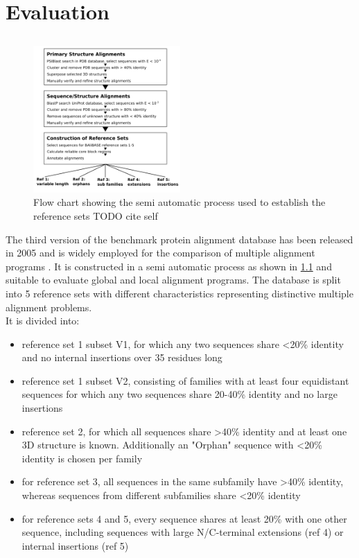 \chapter{Evaluation}

\section{}
\begin{figure}
	\centering
	\includegraphics[width=0.5\textwidth]{./images/balibase.png}
	\caption{Flow chart showing the semi automatic process used to establish the reference sets TODO cite self}
	\label{fig:balibase}
\end{figure}

The third version of the \bb benchmark protein alignment database has been released in 2005 and is widely employed for the comparison of multiple alignment programs \cite{thompson2005balibase, Russell2016}. It is constructed in a semi automatic process as shown in \cref{fig:balibase} and suitable to evaluate global and local alignment programs. The database is split into 5 reference sets with different characteristics representing distinctive multiple alignment problems. \\
It is divided into:



\begin{itemize}
	\item reference set 1 subset V1, for which any two sequences share <20\% identity and no internal insertions over 35 residues long
	\item reference set 1 subset V2, consisting of families with at least four equidistant sequences for which any two sequences share 20-40\% identity and no large insertions
	\item reference set 2, for which all sequences share >40\% identity and at least one 3D structure is known. Additionally an "Orphan" sequence with <20\% identity is chosen per family
	\item for reference set 3, all sequences in the same subfamily have >40\% identity, whereas sequences from different subfamilies share <20\% identity
	\item for reference sets 4 and 5, every sequence shares at least 20\% with one other sequence, including sequences with large N/C-terminal extensions (ref 4) or internal insertions (ref 5)
\end{itemize}

